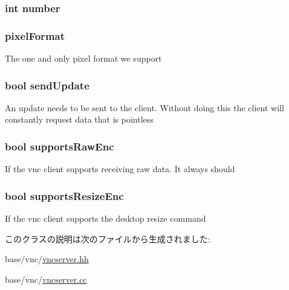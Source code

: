 \label{classVncServer_ad7f258b1b869b6152bc5040c38b79d39}
\hypertarget{classVncServer_a7106e2abc437ad981830d14176d15f09}{
\subsubsection[{number}]{\setlength{\rightskip}{0pt plus 5cm}int {\bf number}}}
\label{classVncServer_a7106e2abc437ad981830d14176d15f09}
\hypertarget{classVncServer_a126e69cd1de897ecc9b84e858e4809c7}{
\subsubsection[{pixelFormat}]{ {\bf pixelFormat}}}
\label{classVncServer_a126e69cd1de897ecc9b84e858e4809c7}
The one and only pixel format we support \hypertarget{classVncServer_ab2b958eb553dde858c8737b57614e87d}{
\subsubsection[{sendUpdate}]{\setlength{\rightskip}{0pt plus 5cm}bool {\bf sendUpdate}}}
\label{classVncServer_ab2b958eb553dde858c8737b57614e87d}
An update needs to be sent to the client. Without doing this the client will constantly request data that is pointless \hypertarget{classVncServer_a1286ea1dbf0c332e14ccfc0267de405e}{
\subsubsection[{supportsRawEnc}]{\setlength{\rightskip}{0pt plus 5cm}bool {\bf supportsRawEnc}}}
\label{classVncServer_a1286ea1dbf0c332e14ccfc0267de405e}
If the vnc client supports receiving raw data. It always should \hypertarget{classVncServer_a68ae35695f8a6dcd68d9ff80dee28736}{
\subsubsection[{supportsResizeEnc}]{\setlength{\rightskip}{0pt plus 5cm}bool {\bf supportsResizeEnc}}}
\label{classVncServer_a68ae35695f8a6dcd68d9ff80dee28736}
If the vnc client supports the desktop resize command 

このクラスの説明は次のファイルから生成されました:\begin{DoxyCompactItemize}
\item 
base/vnc/\hyperlink{vncserver_8hh}{vncserver.hh}\item 
base/vnc/\hyperlink{vncserver_8cc}{vncserver.cc}\end{DoxyCompactItemize}
